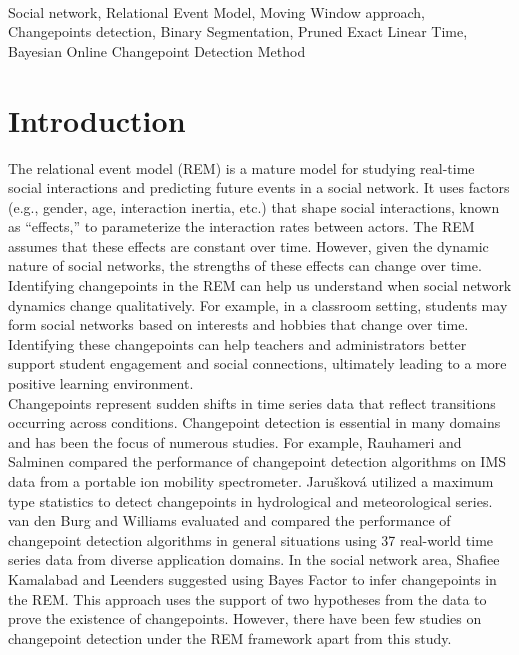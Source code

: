 \documentclass[]{interact}
\theoremstyle{plain}%
\theoremstyle{definition}
\theoremstyle{remark}
\begin{document}
	 \\
	{\small{Social network, Relational Event Model, Moving Window approach, Changepoints detection, Binary Segmentation, Pruned Exact Linear Time, Bayesian Online Changepoint Detection Method}
	
	\newpage


	\section{\fontsize{14}{15}\selectfont Introduction} \label{sec:intro}
	
	\hspace{0.2cm} The relational event model (REM) is a mature model for studying real-time social interactions and predicting future events in a social network. It uses factors (e.g., gender, age, interaction inertia, etc.) that shape social interactions, known as ``effects,''\cite{buttsRelationalEventFramework2008} to parameterize the interaction rates between actors. The REM assumes that these effects are constant over time. However, given the dynamic nature of social networks, the strengths of these effects can change over time. Identifying changepoints in the REM can help us understand when social network dynamics change qualitatively. For example, in a classroom setting, students may form social networks based on interests and hobbies that change over time. Identifying these changepoints can help teachers and administrators better support student engagement and social connections, ultimately leading to a more positive learning environment. \\
	
	Changepoints represent sudden shifts in time series data that reflect transitions occurring across conditions\cite{sharmaTrendAnalysisChange2016}\cite{aminikhanghahiSurveyMethodsTime2017}. Changepoint detection is essential in many domains and has been the focus of numerous studies. For example, Rauhameri and Salminen compared the performance of changepoint detection algorithms on IMS data from a portable ion mobility spectrometer\cite{rauhameriComparisonOnlineMethods2022}. Jarušková utilized a maximum type statistics to detect changepoints in hydrological and meteorological series\cite{jaruskovaProblemsApplicationChangePoint1997}. van den Burg and Williams evaluated and compared the performance of changepoint detection algorithms in general situations using 37 real-world time series data from diverse application domains\cite{burgEvaluationChangePoint2022}. In the social network area, Shafiee Kamalabad and Leenders suggested using Bayes Factor to infer changepoints in the REM\cite{shafieekamalabadWhatPointChange2023}. This approach uses the support of two hypotheses from the data to prove the existence of changepoints. However, there have been few studies on changepoint detection under the REM framework apart from this study. \\
	
}
\end{document}
